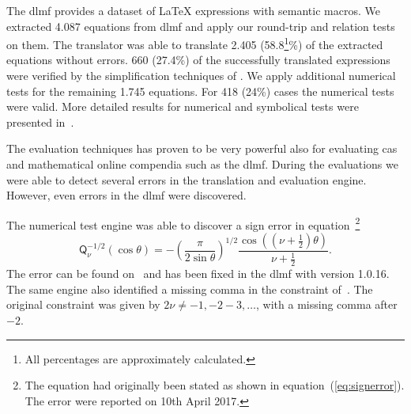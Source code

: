 The \gls*{dlmf} provides a dataset of \LaTeX{} expressions with semantic macros. We extracted 4.087 equations from \gls*{dlmf} and apply our round-trip and relation tests on them. The translator was able to translate 2.405 (58.8\footnote{All percentages are approximately calculated.}\%) of the extracted equations without errors. 660 (27.4\%) of the successfully translated expressions were verified by the simplification techniques of \Maple. We apply additional numerical tests for the remaining 1.745 equations. For 418 (24\%) cases the numerical tests were valid. More detailed results for numerical and symbolical tests were presented in~\parencite{NumericalTests:Paper}.

The evaluation techniques has proven to be very powerful also for evaluating \gls*{cas} and mathematical online compendia such as the \gls*{dlmf}. During the evaluations we were able to detect several errors in the translation and evaluation engine. However, even errors in the \gls*{dlmf} were discovered.

The numerical test engine was able to discover a sign error in equation~\parencite[eq. 14.5.14]{NIST:DLMF}\footnote{The equation had originally been stated as shown in equation~(\ref{eq:signerror}). The error were reported on 10th April 2017.}
\begin{equation}\label{eq:signerror}
\displaystyle \mathsf{Q}^{-1/2}_{\nu}\left(\cos\theta\right)=-\left(\frac{\pi}{2\sin\theta}\right)^{1/2}\frac{\cos\left(\left(\nu+\frac{1}{2}\right)\theta\right)}{\nu+\frac{1}{2}}.
\end{equation}
The error can be found on~\parencite[p. 359]{NIST:Handbook} and has been fixed in the \gls*{dlmf} with version 1.0.16. The same engine also identified a missing comma in the constraint of~\parencite[eq. 10.16.7]{NIST:DLMF}. The original constraint was given by $2\nu \neq -1, -2 -3, \ldots$, with a missing comma after $-2$.



